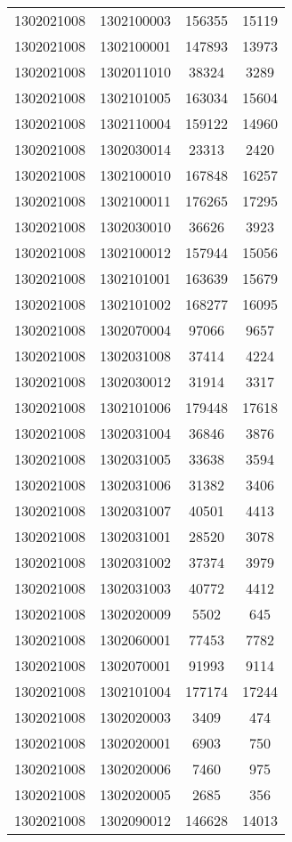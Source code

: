 \begin{longtable}{llcc}
1302021008 & 1302100003 & 156355 & 15119\\
1302021008 & 1302100001 & 147893 & 13973\\
1302021008 & 1302011010 & 38324 & 3289\\
1302021008 & 1302101005 & 163034 & 15604\\
1302021008 & 1302110004 & 159122 & 14960\\
1302021008 & 1302030014 & 23313 & 2420\\
1302021008 & 1302100010 & 167848 & 16257\\
1302021008 & 1302100011 & 176265 & 17295\\
1302021008 & 1302030010 & 36626 & 3923\\
1302021008 & 1302100012 & 157944 & 15056\\
1302021008 & 1302101001 & 163639 & 15679\\
1302021008 & 1302101002 & 168277 & 16095\\
1302021008 & 1302070004 & 97066 & 9657\\
1302021008 & 1302031008 & 37414 & 4224\\
1302021008 & 1302030012 & 31914 & 3317\\
1302021008 & 1302101006 & 179448 & 17618\\
1302021008 & 1302031004 & 36846 & 3876\\
1302021008 & 1302031005 & 33638 & 3594\\
1302021008 & 1302031006 & 31382 & 3406\\
1302021008 & 1302031007 & 40501 & 4413\\
1302021008 & 1302031001 & 28520 & 3078\\
1302021008 & 1302031002 & 37374 & 3979\\
1302021008 & 1302031003 & 40772 & 4412\\
1302021008 & 1302020009 & 5502 & 645\\
1302021008 & 1302060001 & 77453 & 7782\\
1302021008 & 1302070001 & 91993 & 9114\\
1302021008 & 1302101004 & 177174 & 17244\\
1302021008 & 1302020003 & 3409 & 474\\
1302021008 & 1302020001 & 6903 & 750\\
1302021008 & 1302020006 & 7460 & 975\\
1302021008 & 1302020005 & 2685 & 356\\
1302021008 & 1302090012 & 146628 & 14013\\

\end{longtable}
